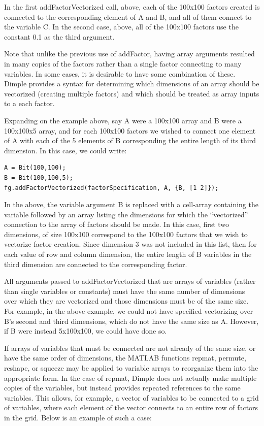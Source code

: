In the first addFactorVectorized call, above, each of the 100x100 factors created is connected to the corresponding element of A and B, and all of them connect to the variable C.  In the second case, above, all of the 100x100 factors use the constant 0.1 as the third argument.

Note that unlike the previous use of addFactor, having array arguments resulted in many copies of the factors rather than a single factor connecting to many variables.  In some cases, it is desirable to have some combination of these.  Dimple provides a syntax for determining which dimensions of an array should be vectorized (creating multiple factors) and which should be treated as array inputs to a each factor.

Expanding on the example above, say A were a 100x100 array and B were a 100x100x5 array, and for each 100x100 factors we wished to connect one element of A with each of the 5 elements of B corresponding the entire length of its third dimension.  In this case, we could write:

\begin{lstlisting}
A = Bit(100,100);
B = Bit(100,100,5);
fg.addFactorVectorized(factorSpecification, A, {B, [1 2]});
\end{lstlisting}

In the above, the variable argument B is replaced with a cell-array containing the variable followed by an array listing the dimensions for which the ``vectorized'' connection to the array of factors should be made.  In this case, first two dimensions, of size 100x100 correspond to the 100x100 factors that we wish to vectorize factor creation.  Since dimension 3 was not included in this list, then for each value of row and column dimension, the entire length of B variables in the third dimension are connected to the corresponding factor.

All arguments passed to addFactorVectorized that are arrays of variables (rather than single variables or constants) must have the same number of dimensions over which they are vectorized and those dimensions must be of the same size.  For example, in the above example, we could not have specified vectorizing over B's second and third dimensions, which do not have the same size as A.  However, if B were instead 5x100x100, we could have done so.

If arrays of variables that must be connected are not already of the same size, or have the same order of dimensions, the MATLAB functions repmat, permute, reshape, or squeeze may be applied to variable arrays to reorganize them into the appropriate form.  In the case of repmat, Dimple does not actually make multiple copies of the variables, but instead provides repeated references to the same variables.  This allows, for example, a vector of variables to be connected to a grid of variables, where each element of the vector connects to an entire row of factors in the grid.  Below is an example of such a case:


